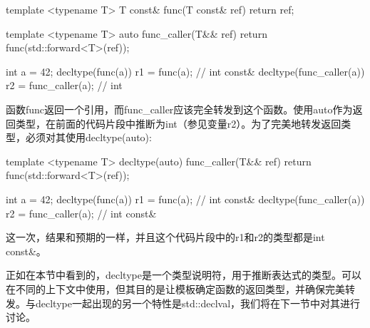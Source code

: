 \begin{cpp}
template <typename T>
T const& func(T const& ref)
{
	return ref;
}

template <typename T>
auto func_caller(T&& ref)
{
return func(std::forward<T>(ref));
}

int a = 42;
decltype(func(a)) r1 = func(a); // int const&
decltype(func_caller(a)) r2 = func_caller(a); // int
\end{cpp}

函数func返回一个引用，而func\_caller应该完全转发到这个函数。使用auto作为返回类型，在前面的代码片段中推断为int（参见变量r2）。为了完美地转发返回类型，必须对其使用decltype(auto):

\begin{cpp}
template <typename T>
decltype(auto) func_caller(T&& ref)
{
	return func(std::forward<T>(ref));
}

int a = 42;
decltype(func(a)) r1 = func(a); // int const&
decltype(func_caller(a)) r2 = func_caller(a); // int const&
\end{cpp}

这一次，结果和预期的一样，并且这个代码片段中的r1和r2的类型都是int const\&。

正如在本节中看到的，decltype是一个类型说明符，用于推断表达式的类型。可以在不同的上下文中使用，但其目的是让模板确定函数的返回类型，并确保完美转发。与decltype一起出现的另一个特性是std::declval，我们将在下一节中对其进行讨论。









